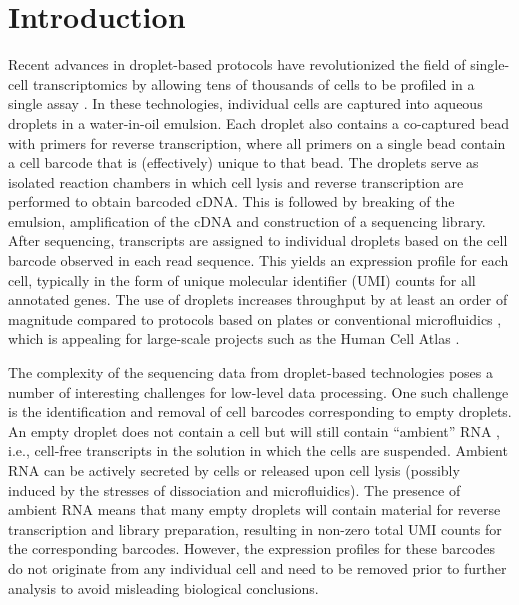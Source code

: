 \documentclass[10pt,letterpaper]{article}
\begin{document}
\section*{Introduction}
Recent advances in droplet-based protocols have revolutionized the field of single-cell transcriptomics by allowing tens of thousands of cells to be profiled in a single assay \cite{macosko2015highly,klein2015droplet,zheng2017massively}.
In these technologies, individual cells are captured into aqueous droplets in a water-in-oil emulsion.
Each droplet also contains a co-captured bead with primers for reverse transcription, where all primers on a single bead contain a cell barcode that is (effectively) unique to that bead.
The droplets serve as isolated reaction chambers in which cell lysis and reverse transcription are performed to obtain barcoded cDNA.
This is followed by breaking of the emulsion, amplification of the cDNA and construction of a sequencing library.
After sequencing, transcripts are assigned to individual droplets based on the cell barcode observed in each read sequence.
This yields an expression profile for each cell, typically in the form of unique molecular identifier (UMI) counts \cite{islam2014quantitative} for all annotated genes. 
The use of droplets increases throughput by at least an order of magnitude compared to protocols based on plates \cite{picelli2013smartseq2} or conventional microfluidics \cite{pollen2014low}, which is appealing for large-scale projects such as the Human Cell Atlas \cite{regev2017human}.

The complexity of the sequencing data from droplet-based technologies poses a number of interesting challenges for low-level data processing.
One such challenge is the identification and removal of cell barcodes corresponding to empty droplets.
An empty droplet does not contain a cell but will still contain ``ambient'' RNA \cite{macosko2015highly}, i.e., cell-free transcripts in the solution in which the cells are suspended.
Ambient RNA can be actively secreted by cells or released upon cell lysis (possibly induced by the stresses of dissociation and microfluidics).
The presence of ambient RNA means that many empty droplets will contain material for reverse transcription and library preparation, resulting in non-zero total UMI counts for the corresponding barcodes.
However, the expression profiles for these barcodes do not originate from any individual cell and need to be removed prior to further analysis to avoid misleading biological conclusions.
\end{document}
